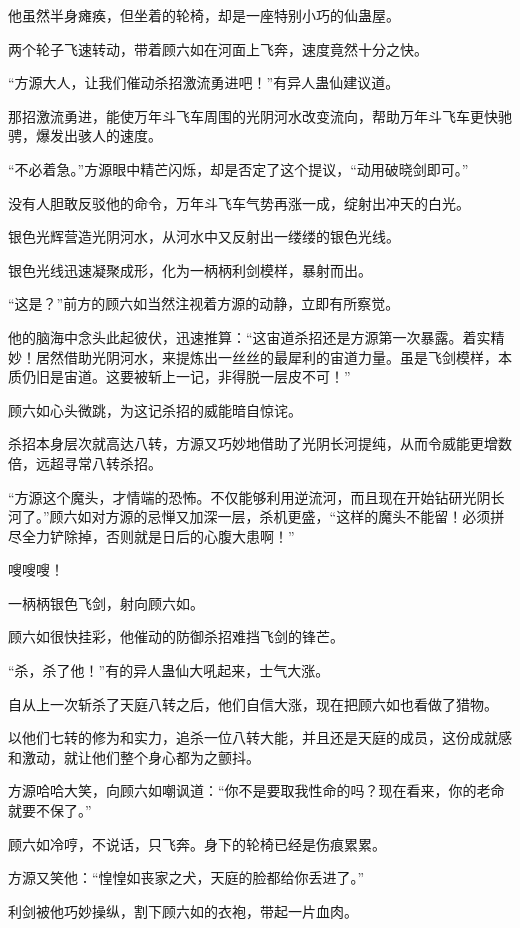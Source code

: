 \begin{this_body}
他虽然半身瘫痪，但坐着的轮椅，却是一座特别小巧的仙蛊屋。

两个轮子飞速转动，带着顾六如在河面上飞奔，速度竟然十分之快。

“方源大人，让我们催动杀招激流勇进吧！”有异人蛊仙建议道。

那招激流勇进，能使万年斗飞车周围的光阴河水改变流向，帮助万年斗飞车更快驰骋，爆发出骇人的速度。

“不必着急。”方源眼中精芒闪烁，却是否定了这个提议，“动用破晓剑即可。”

没有人胆敢反驳他的命令，万年斗飞车气势再涨一成，绽射出冲天的白光。

银色光辉营造光阴河水，从河水中又反射出一缕缕的银色光线。

银色光线迅速凝聚成形，化为一柄柄利剑模样，暴射而出。

“这是？”前方的顾六如当然注视着方源的动静，立即有所察觉。

他的脑海中念头此起彼伏，迅速推算：“这宙道杀招还是方源第一次暴露。着实精妙！居然借助光阴河水，来提炼出一丝丝的最犀利的宙道力量。虽是飞剑模样，本质仍旧是宙道。这要被斩上一记，非得脱一层皮不可！”

顾六如心头微跳，为这记杀招的威能暗自惊诧。

杀招本身层次就高达八转，方源又巧妙地借助了光阴长河提纯，从而令威能更增数倍，远超寻常八转杀招。

“方源这个魔头，才情端的恐怖。不仅能够利用逆流河，而且现在开始钻研光阴长河了。”顾六如对方源的忌惮又加深一层，杀机更盛，“这样的魔头不能留！必须拼尽全力铲除掉，否则就是日后的心腹大患啊！”

嗖嗖嗖！

一柄柄银色飞剑，射向顾六如。

顾六如很快挂彩，他催动的防御杀招难挡飞剑的锋芒。

“杀，杀了他！”有的异人蛊仙大吼起来，士气大涨。

自从上一次斩杀了天庭八转之后，他们自信大涨，现在把顾六如也看做了猎物。

以他们七转的修为和实力，追杀一位八转大能，并且还是天庭的成员，这份成就感和激动，就让他们整个身心都为之颤抖。

方源哈哈大笑，向顾六如嘲讽道：“你不是要取我性命的吗？现在看来，你的老命就要不保了。”

顾六如冷哼，不说话，只飞奔。身下的轮椅已经是伤痕累累。

方源又笑他：“惶惶如丧家之犬，天庭的脸都给你丢进了。”

利剑被他巧妙操纵，割下顾六如的衣袍，带起一片血肉。


\end{this_body}
